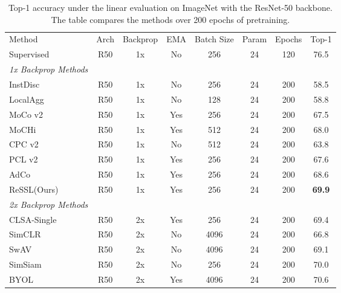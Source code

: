 \documentclass{article}
\newcommand{\<}{\left\langle}
\renewcommand{\>}{\right\rangle}
\begin{document}
 \begin{table}[b]
 \vspace{-10pt}
 \centering
 \small
 \caption{Top-1 accuracy under the linear evaluation on ImageNet with the ResNet-50 backbone. The table compares the methods over 200 epochs of pretraining.}
 \label{table:200epoch}
 \vspace{-5pt}
\begin{tabular}{l  c c c c c c c} 
\toprule 
Method & Arch & Backprop & EMA & Batch Size & Param & Epochs & Top-1 \\
Supervised & R50 & 1x & No & 256 & 24 & 120 & 76.5 \\ \hline
\emph{1x Backprop Methods } \\
InstDisc \cite{instance_discrimination} & R50 & 1x & No  & 256 & 24 & 200 & 58.5 \\
LocalAgg \cite{local}                   & R50 & 1x & No  & 128 & 24 & 200 & 58.8 \\
MoCo v2 \cite{mocov2}                   & R50 & 1x & Yes & 256 & 24 & 200 & 67.5 \\
MoCHi \cite{mochi}                      & R50 & 1x & Yes & 512 & 24 & 200 & 68.0 \\
CPC v2 \cite{cpc}                       & R50 & 1x & No  & 512 & 24 & 200 & 63.8 \\
PCL v2 \cite{PCL}                       & R50 & 1x & Yes & 256 & 24 & 200 & 67.6 \\
AdCo \cite{adco}                        & R50 & 1x & Yes & 256 & 24 & 200 & 68.6 \\
ReSSL(Ours)                             & R50 & 1x & Yes & 256 & 24 & 200 & \textbf{69.9} \\
\hline
\emph{2x Backprop Methods } \\
CLSA-Single \cite{stronger}             & R50 & 2x & Yes & 256  & 24 & 200 & 69.4 \\
SimCLR \cite{simclr}                    & R50 & 2x & No  & 4096 & 24 & 200 & 66.8 \\
SwAV \cite{swav}                        & R50 & 2x & No  & 4096 & 24 & 200 & 69.1 \\
SimSiam \cite{byol} & R50 & 2x & No  & 256  & 24 & 200 & 70.0 \\
BYOL \cite{byol}    & R50 & 2x & Yes & 4096 & 24 & 200 & 70.6 \\
\hline
\toprule
\end{tabular}
\end{table}
\end{document}
